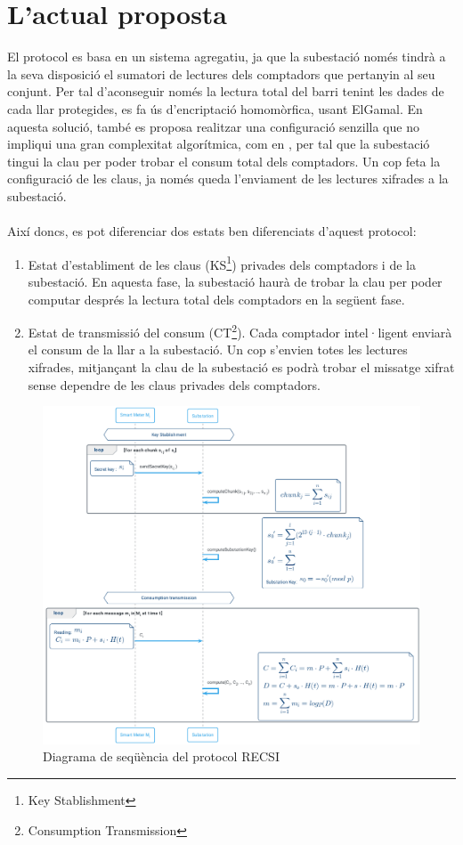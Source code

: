 \documentclass{article}
\begin{document}
\section{L'actual proposta}
El protocol \cite{recsi} es basa en un sistema agregatiu, ja que la subestació només tindrà a la seva disposició el sumatori de lectures dels comptadors que pertanyin al seu conjunt. Per tal d'aconseguir només la lectura total del barri tenint les dades de cada llar protegides, es fa ús d'encriptació homomòrfica, usant ElGamal.
En aquesta solució, també es proposa realitzar una configuració senzilla que no impliqui una gran complexitat algorítmica, com en \cite{busom}, per tal que la subestació tingui la clau per poder trobar el consum total dels comptadors. Un cop feta la configuració de les claus, ja només queda l'enviament de les lectures xifrades a la subestació.
\\\\
Així doncs, es pot diferenciar dos estats ben diferenciats d'aquest protocol:
\begin{enumerate}
\item Estat d'establiment de les claus (KS\footnote{Key Stablishment}) privades dels comptadors i de la subestació. En aquesta fase, la subestació haurà de trobar la clau per poder computar després la lectura total dels comptadors en la següent fase.
\item Estat de transmissió del consum (CT\footnote{Consumption Transmission}). Cada comptador intel·ligent enviarà el consum de la llar a la subestació. Un cop s'envien totes les lectures xifrades, mitjançant la clau de la subestació es podrà trobar el missatge xifrat sense dependre de les claus privades dels comptadors. 
\end{enumerate}
\begin{figure}[H]
	\centering
	\includegraphics[width=16cm]{umls/recsi.png}
	\caption{Diagrama de seqüència del protocol RECSI}
\end{figure}
\end{document}
